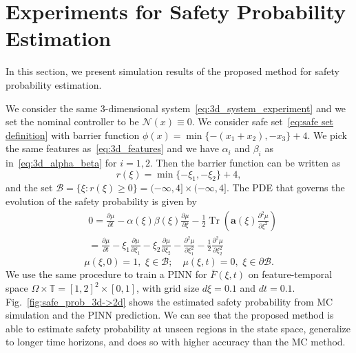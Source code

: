 \documentclass[letterpaper]{article} %
\begin{document}
\section{Experiments for Safety Probability Estimation}

In this section, we present simulation results of the proposed method for safety probability estimation.

We consider the same 3-dimensional system~\eqref{eq:3d_system_experiment}
and we set the nominal controller to be $\mathcal{N}(x) \equiv 0$. We consider safe set~\eqref{eq:safe set definition} with barrier function $\phi(x) = \min\{-(x_1+x_2), -x_3\}+4$. We pick the same features as~\eqref{eq:3d_features} and we have $\alpha_i$ and $\beta_i$ as in~\eqref{eq:3d_alpha_beta} for $i = 1,2$. Then the barrier function can be written as
\begin{equation}
    r(\xi) = \min\{-\xi_1, -\xi_2\}+4,
\end{equation}
and the set $\mathcal{B} = \{\xi: r(\xi) \geq 0\} = (-\infty,4] \times (-\infty,4]$. The PDE that governs the evolution of the safety probability is given by
\begin{equation}
\begin{aligned}
    & 0 = \frac{\partial \mu}{\partial t} - 
    \alpha(\xi) \beta(\xi) \frac{\partial \mu}{\partial \xi} - \frac{1}{2} \operatorname{Tr} \left(\mathbf{a}(\xi) \frac{\partial^2 \mu}{\partial \xi^2} \right)  \\
    & = \frac{\partial \mu}{\partial t} - \xi_1 \frac{\partial \mu}{\partial \xi_1} - \xi_2 \frac{\partial \mu}{\partial \xi_2} - \frac{\partial^2 \mu}{\partial \xi_1^2} - \frac{1}{2} \frac{\partial^2 \mu}{\partial \xi_2^2} 
\end{aligned}
\end{equation}
\begin{equation}
    \mu(\xi,0)  =1, \,\, \xi \in \mathcal{B}; \quad \mu(\xi,t) =0, \,\, \xi \in \partial \mathcal{B}.
\end{equation}
We use the same procedure to train a PINN for $\bar F(\xi,t)$ on feature-temporal space $\Omega \times \mathbb{T} = [1,2]^2 \times [0,1]$, with grid size $d\xi = 0.1$ and $dt = 0.1$. Fig.~\ref{fig:safe_prob_3d->2d} shows the estimated safety probability from MC simulation and the PINN prediction. 
We can see that the proposed method is able to estimate safety probability at unseen regions in the state space, generalize to longer time horizons, and does so with higher accuracy than the MC method.
\end{document}
